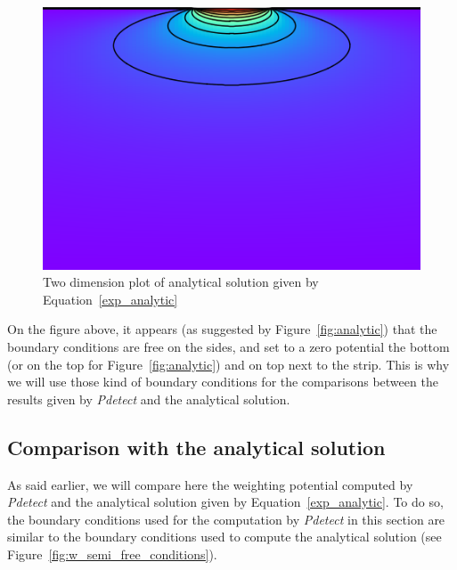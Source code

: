 \documentclass[11pt]{article}
\begin{document}
		\begin{figure}[H]
			\center
			\includegraphics[scale=0.5]{images/boundary_conditions/detector/plot_analytic.png}
			\caption{Two dimension plot of analytical solution given by Equation~\ref{exp_analytic}}
			\label{fig:plot_analytic}
		\end{figure}

		On the figure above, it appears (as suggested by Figure~\ref{fig:analytic}) that the boundary
		conditions are free on the sides, and set to a zero potential  the bottom (or on the top for
		Figure~\ref{fig:analytic}) and on top next to the strip. This is why we will use those kind
		of boundary conditions for the comparisons between the results given by \textit{Pdetect} and
		the analytical solution.

	\subsection{Comparison with the analytical solution} \label{comparisons}

		As said earlier, we will compare here the weighting potential computed by \textit{Pdetect} and
		the analytical solution given by Equation~\ref{exp_analytic}.
		To do so, the boundary conditions used for the computation by \textit{Pdetect} in this section
		are similar to the boundary conditions used to compute the analytical solution (see
		Figure~\ref{fig:w_semi_free_conditions}).
\end{document}
